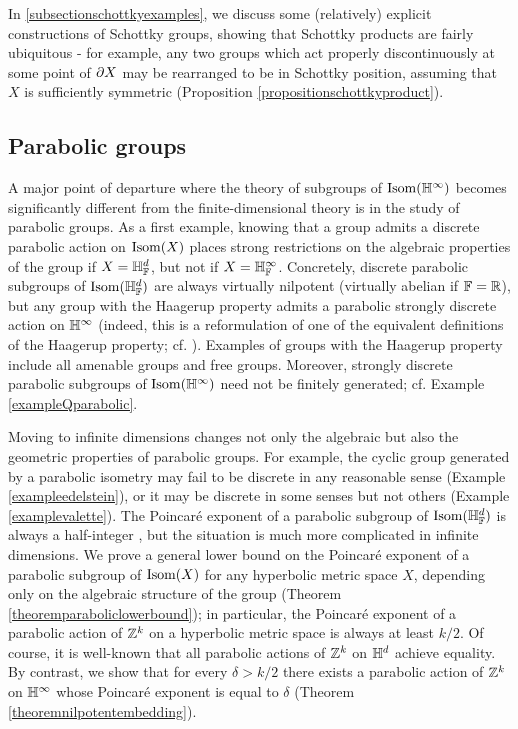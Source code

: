 In \6\ref{subsectionschottkyexamples}, we discuss some (relatively) explicit constructions of Schottky groups, showing that Schottky products are fairly ubiquitous - for example, any two groups which act properly discontinuously at some point of $\partial X$ may be rearranged to be in Schottky position, assuming that $X$ is sufficiently symmetric (Proposition \ref{propositionschottkyproduct}).%


\subsection{Parabolic groups}

A major point of departure where the theory of subgroups of $\Isom(\H^\infty)$ becomes significantly different from the finite-dimensional theory is in the study of parabolic groups. As a first example, knowing that a group admits a discrete parabolic action on $\operatorname{Isom}(X)$ places strong restrictions on the algebraic properties of the group if $X = \H_\F^d$, but not if $X = \H_\F^\infty$. Concretely, discrete parabolic subgroups of $\Isom(\H_\F^d)$ are always virtually nilpotent (virtually abelian if $\F = \R$), but any group with the Haagerup property admits a parabolic strongly discrete action on $\H^\infty$ (indeed, this is a reformulation of one of the equivalent definitions of the Haagerup property; cf. \cite[p.1, (4)]{CCJJV}). Examples of groups with the Haagerup property include all amenable groups and free groups. Moreover, strongly discrete parabolic subgroups of $\Isom(\H^\infty)$ need not be finitely generated; cf. Example \ref{exampleQparabolic}.

Moving to infinite dimensions changes not only the algebraic but also the geometric properties of parabolic groups. For example, the cyclic group generated by a parabolic isometry may fail to be discrete in any reasonable sense (Example \ref{exampleedelstein}), or it may be discrete in some senses but not others (Example \ref{examplevalette}). The Poincar\'e exponent of a parabolic subgroup of $\Isom(\H_\F^d)$ is always a half-integer \cite[Proof of Lemma 3.5]{CorletteIozzi}, but the situation is much more complicated in infinite dimensions. We prove a general lower bound on the Poincar\'e exponent of a parabolic subgroup of $\operatorname{Isom}(X)$ for any hyperbolic metric space $X$, depending only on the algebraic structure of the group (Theorem \ref{theoremparaboliclowerbound}); in particular, the Poincar\'e exponent of a parabolic action of $\Z^k$ on a hyperbolic metric space is always at least $k/2$. Of course, it is well-known that all parabolic actions of $\Z^k$ on $\H^d$ achieve equality. By contrast, we show that for every $\delta > k/2$ there exists a parabolic action of $\Z^k$ on $\H^\infty$ whose Poincar\'e exponent is equal to $\delta$ (Theorem \ref{theoremnilpotentembedding}).

